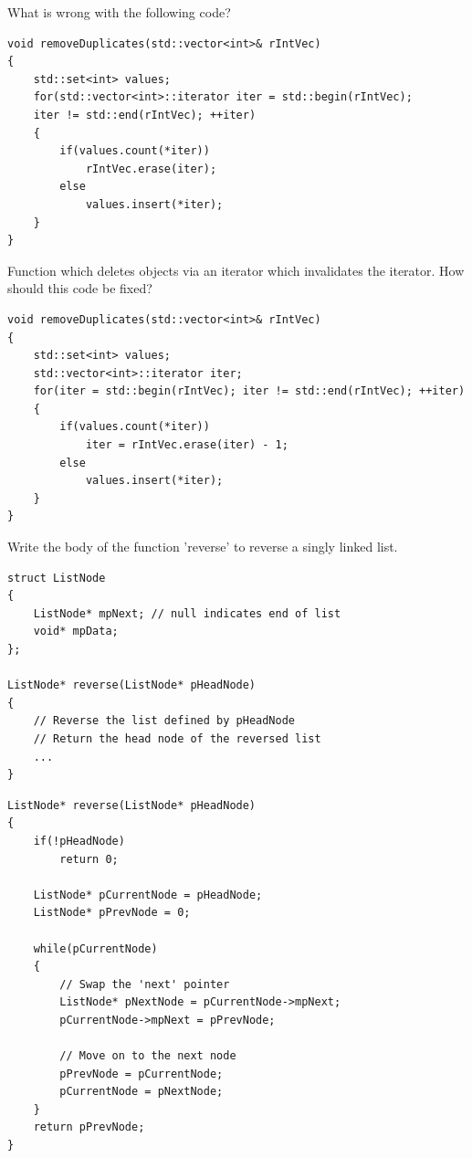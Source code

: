 \documentclass{exam}
\begin{document}
\begin{questions}
\question What is wrong with the following code?
\begin{lstlisting}
void removeDuplicates(std::vector<int>& rIntVec)
{
	std::set<int> values;
	for(std::vector<int>::iterator iter = std::begin(rIntVec);
	iter != std::end(rIntVec); ++iter)
	{
		if(values.count(*iter))
			rIntVec.erase(iter);
		else
			values.insert(*iter);
	}
}
\end{lstlisting}
\begin{solution}[.2in]
Function which deletes objects via an iterator which invalidates the iterator. How should this code be fixed?
\begin{lstlisting}
void removeDuplicates(std::vector<int>& rIntVec)
{
	std::set<int> values;
	std::vector<int>::iterator iter;
	for(iter = std::begin(rIntVec); iter != std::end(rIntVec); ++iter)
	{
		if(values.count(*iter))
			iter = rIntVec.erase(iter) - 1;
		else
			values.insert(*iter);
	}
}
\end{lstlisting}
\end{solution}

\question Write the body of the function 'reverse' to reverse a singly linked list.
\begin{lstlisting}
struct ListNode
{
	ListNode* mpNext; // null indicates end of list
	void* mpData;
};

ListNode* reverse(ListNode* pHeadNode)
{
	// Reverse the list defined by pHeadNode
	// Return the head node of the reversed list
	...
}
\end{lstlisting}
\begin{solution}[.2in]
\begin{lstlisting}
ListNode* reverse(ListNode* pHeadNode)
{
	if(!pHeadNode)
		return 0;
		
	ListNode* pCurrentNode = pHeadNode;
	ListNode* pPrevNode = 0;

	while(pCurrentNode)
	{
		// Swap the 'next' pointer
		ListNode* pNextNode = pCurrentNode->mpNext;
		pCurrentNode->mpNext = pPrevNode;
		
		// Move on to the next node
		pPrevNode = pCurrentNode;
		pCurrentNode = pNextNode;
	}
	return pPrevNode;
}
\end{lstlisting}
\end{solution}


\end{questions}
\end{document}
